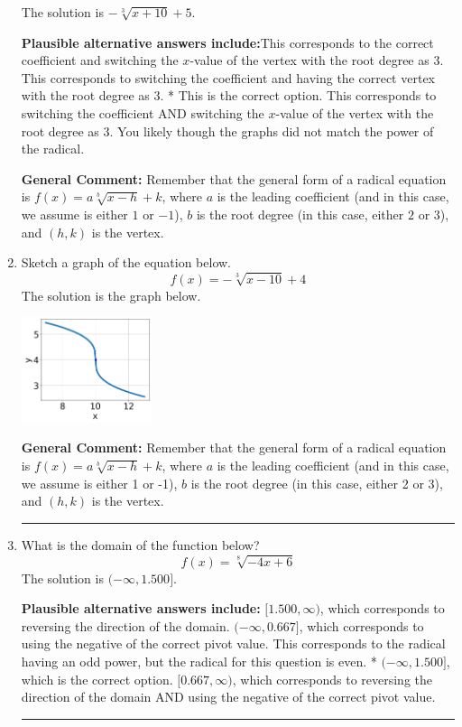 \documentclass{extbook}[14pt]
\newcommand{\litem}[1]{\item #1

\rule{\textwidth}{0.4pt}}
\begin{document}
\begin{enumerate}
{The solution is \( - \sqrt[3]{x + 10} + 5 \).\begin{enumerate}[label=\Alph*.]
\textbf{Plausible alternative answers include:}This corresponds to the correct coefficient and switching the $x$-value of the vertex with the root degree as $3$.
This corresponds to switching the coefficient and having the correct vertex with the root degree as $3$.
* This is the correct option.
This corresponds to switching the coefficient AND switching the $x$-value of the vertex with the root degree as $3$.
You likely though the graphs did not match the power of the radical.
\end{enumerate}

\textbf{General Comment:} Remember that the general form of a radical equation is $ f(x) = a \sqrt[b]{x - h} + k$, where $a$ is the leading coefficient (and in this case, we assume is either $1$ or $-1$), $b$ is the root degree (in this case, either $2$ or $3$), and $(h, k)$ is the vertex.
}
\litem{
Sketch a graph of the equation below.
\[ f(x) = - \sqrt[3]{x - 10} + 4 \]The solution is the graph below.
    \begin{center}
        \includegraphics[width=0.3\textwidth]{../Figures/radicalEquationToGraphCopyAC.png}
    \end{center}

\textbf{General Comment:} Remember that the general form of a radical equation is $ f(x) = a \sqrt[b]{x - h} + k $, where $a$ is the leading coefficient (and in this case, we assume is either 1 or -1), $b$ is the root degree (in this case, either 2 or 3), and $(h, k)$ is the vertex.
}
\litem{
What is the domain of the function below?
\[ f(x) = \sqrt[8]{-4 x + 6} \]The solution is \( (-\infty, 1.500] \).\begin{enumerate}[label=\Alph*.]
\textbf{Plausible alternative answers include:} $[1.500, \infty)$, which corresponds to reversing the direction of the domain.
$(-\infty, 0.667]$, which corresponds to using the negative of the correct pivot value.
This corresponds to the radical having an odd power, but the radical for this question is even.
* $(-\infty, 1.500]$, which is the correct option.
$[0.667, \infty)$, which corresponds to reversing the direction of the domain AND using the negative of the correct pivot value.
\end{enumerate}

}
\end{enumerate}
\end{document}
